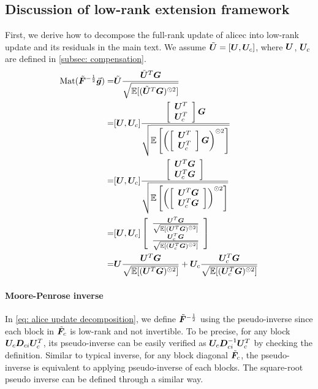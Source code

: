 \subsection{Discussion of low-rank extension framework}
\label{subapp: discussion low-rank}
First, we derive how to decompose the full-rank update of \gls{alicec} into low-rank update and its residuals in the main text. We assume $\tilde{{\bm{U}}}=[{\bm{U}},{\bm{U}}_c]$, where ${\bm{U}}$, ${\bm{U}}_c$ are defined in \cref{subsec: compensation}.
\begin{align*}
    \operatorname{Mat}(\tilde{\bm{F}}^{-\frac{1}{2}}\vec{\bm{g}}) =& \tilde{{\bm{U}}}\frac{\tilde{{\bm{U}}}^T{\bm{G}}}{\sqrt{\mathbb{E}[(\tilde{{\bm{U}}}^T{\bm{G}})^{\odot 2}]}}\\
    =& [{\bm{U}},{\bm{U}}_c] \frac{\left[\begin{array}{c}
         {\bm{U}}^T  \\
          {\bm{U}}_c^T
    \end{array}\right]{\bm{G}}}{\sqrt{\mathbb{E}\left[\left(\left[\begin{array}{c}
         {\bm{U}}^T  \\
          {\bm{U}}_c^T
    \end{array}\right]{\bm{G}}\right)^{\odot 2}\right]}}\\
    =& [{\bm{U}},{\bm{U}}_c]\frac{\left[\begin{array}{c}
         {\bm{U}}^T{\bm{G}}  \\
         {\bm{U}}_c^T{\bm{G}} 
    \end{array}\right]}{\sqrt{\mathbb{E}\left[\left(\left[\begin{array}{c}
         {\bm{U}}^T{\bm{G}}  \\
         {\bm{U}}_c^T{\bm{G}}
    \end{array}\right]\right)^{\odot 2}\right]}}\\
    =&[{\bm{U}},{\bm{U}}_c]\left[\begin{array}{c}
           \frac{{\bm{U}}^T{\bm{G}}}{\sqrt{\mathbb{E}[({\bm{U}}^T{\bm{G}})^{\odot 2}]}}\\
         \frac{{\bm{U}}_c^T{\bm{G}}}{\sqrt{\mathbb{E}[({\bm{U}}_c^T{\bm{G}})^{\odot 2}]}}
    \end{array}\right]\\
    =& {\bm{U}}\frac{{\bm{U}}^T{\bm{G}}}{\sqrt{\mathbb{E}[({\bm{U}}^T{\bm{G}})^{\odot 2}]}} + {\bm{U}}_c\frac{{\bm{U}}_c^T{\bm{G}}}{\sqrt{\mathbb{E}[({\bm{U}}_c^T{\bm{G}})^{\odot 2}]}}
\end{align*}

\paragraph{Moore-Penrose inverse} In \cref{eq: alice update decomposition}, we define $\tilde{\bm{F}}^{-\frac{1}{2}}$ using the pseudo-inverse since each block in $\tilde{\bm{F}}_c$ is low-rank and not invertible. To be precise, for any block ${\bm{U}}_c{\bm{D}}_{ci}{\bm{U}}_c^T$, its pseudo-inverse can be easily verified as ${\bm{U}}_c{\bm{D}}_{ci}^{-1}{\bm{U}}_c^T$ by checking the definition. Similar to typical inverse, for any block diagonal $\tilde{\bm{F}}_c$, the pseudo-inverse is equivalent to applying pseudo-inverse of each blocks. The square-root pseudo inverse can be defined through a similar way. 

